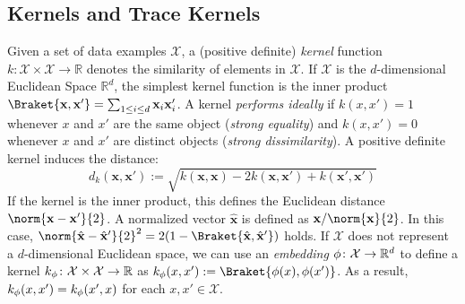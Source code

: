 \subsection{Kernels and Trace Kernels}\label{subsec:katk}
Given a set
of data examples $\mathcal{X}$, a (positive definite) \emph{kernel} function
$k\colon \mathcal{X}\times \mathcal{X}\to \mathbb{R}$ denotes the similarity of elements in $\mathcal{X}$. If $\mathcal{X}$ is
the $d$-dimensional Euclidean Space $\mathbb{R}^d$, the simplest kernel function is the inner product
$\Braket{\mathbf{x},\mathbf{x}'}=\sum_{1\leq i\leq d}\mathbf{x}_i\mathbf{x}'_i$.
A kernel \emph{performs ideally} if $k(x,x')=1$ whenever $x$ and $x'$ are the same object (\textit{strong equality}) and
$k(x,x')=0$ whenever $x$ and $x'$ are distinct objects (\textit{strong dissimilarity}). %
A positive definite kernel induces the distance:\begin{equation}\label{eq:dofk}
d_k(\mathbf{x},\mathbf{x}'):=\sqrt{k(\mathbf{x},\mathbf{x})-2k(\mathbf{x},\mathbf{x}')+k(\mathbf{x}',\mathbf{x}')}
\end{equation}
If the kernel is the inner product, this defines the Euclidean distance $\norm{\mathbf{x}-\mathbf{x}'}{2}$. A normalized vector
$\hat{\mathbf{x}}$ is defined as $\mathbf{x}/\norm{\mathbf{x}}{2}$. In this case,
$\norm{\hat{\mathbf{x}}-\hat{\mathbf{x}}'}{2}^2=2(1-\Braket{\hat{\mathbf{x}},\hat{\mathbf{x}}'})$ holds.
%
If $\mathcal{X}$ does not represent a $d$-dimensional Euclidean space, we can use an \emph{embedding}
$\phi\colon\mathcal{X}\to \mathbb{R}^d$ to define a kernel $k_\phi\colon \mathcal{X}\times \mathcal{X}\to\mathbb{R}$
as $k_\embed(x,x'):=\Braket{\embed(x),\embed(x')}$. As a result, $k_\phi(x,x')=k_\phi(x',x)$ for each
$x,x'\in\mathcal{X}$.

